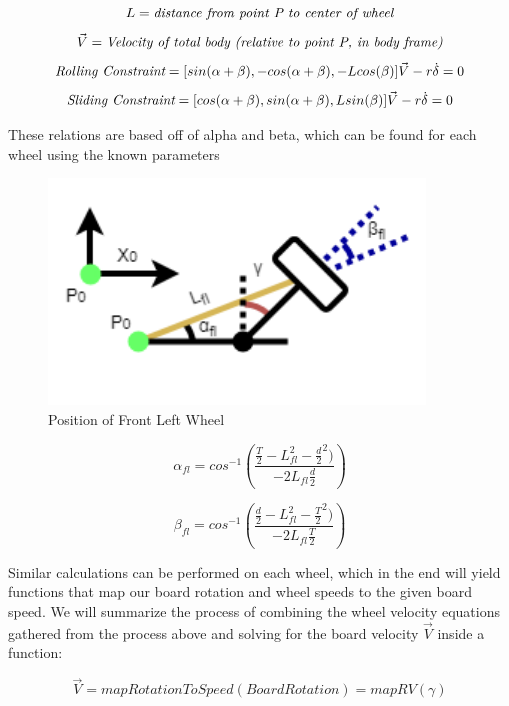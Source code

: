 \documentclass[titlepage, letterpaper,12pt]{article}
\begin{document}
\[L = \emph{distance from point P to center of wheel}\]
\[\vec{V} = \emph{Velocity of total body (relative to point P, in body frame)}\]
\begin{equation}
    \emph{Rolling Constraint} =
    [sin(\alpha + \beta), -cos(\alpha + \beta), -Lcos(\beta)]\vec{V} - r\dot{\delta} = 0
\end{equation}
\begin{equation}
    \emph{Sliding Constraint} =
    [cos(\alpha + \beta), sin(\alpha + \beta), Lsin(\beta)]\vec{V} - r\dot{\delta} = 0
\end{equation}

These relations are based off of alpha and beta, which can be found for each wheel using the known parameters

\begin{figure}[!h]
\caption{Position of Front Left Wheel}
\includegraphics[width=10cm]{figs/FL.png}
\centering
\end{figure}

\begin{equation}
    \alpha _{fl} = cos^{-1}(\frac{\frac{T}{2}-L _{fl}^2-\frac{d}{2}^{2})}{-2L _{fl}\frac{d}{2}})
\end{equation}

\begin{equation}
    \beta _{fl} = cos^{-1}(\frac{\frac{d}{2}-L _{fl}^2-\frac{T}{2}^{2})}{-2L _{fl}\frac{T}{2}})
\end{equation}

Similar calculations can be performed on each wheel, which in the end will yield functions that map our board rotation and wheel speeds to the given board speed. We will summarize the process of combining the wheel velocity equations gathered from the process above and solving for the board velocity $\vec{V}$ inside a function:

\begin{equation}
    \vec{V} = mapRotationToSpeed(Board Rotation) = mapRV(\gamma)
\end{equation}
\end{document}
